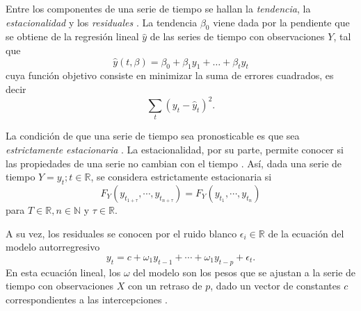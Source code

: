 \documentclass[final,5p,times,twocolumn]{elsarticle}
\begin{document}
Entre los componentes de una serie de tiempo se hallan la \textit{tendencia}, la \textit{estacionalidad} y los \textit{residuales} \cite{brockwell2016}. La tendencia $\beta_0$ viene dada por la pendiente que se obtiene de la regresión lineal $\hat{y}$ de las series de tiempo con observaciones $Y$, tal que
\begin{equation}
  \hat{y}(t, \beta) = \beta_0 + \beta_1 y_1 + \ldots + \beta_t y_t
\end{equation}
cuya función objetivo consiste en minimizar la suma de errores cuadrados, es decir
\begin{equation}
  \sum_t (y_t - \hat{y}_t)^2.
\end{equation}

La condición de que una serie de tiempo sea pronosticable es que sea \textit{estrictamente estacionaria} \cite{brockwell2016}. La estacionalidad, por su parte, permite conocer si las propiedades de una serie no cambian con el tiempo \cite{coxEA1965}. Así, dada una serie de tiempo $Y = y_t; t \in \mathbb{R}$, se considera estrictamente estacionaria si
\begin{equation}
  F_Y(y_{t_{1 + \tau}}, \cdots, y_{t_{n + \tau}}) = F_Y(y_{t_{1}}, \cdots, y_{t_{n}})
\end{equation}
para $T \in \mathbb{R}, n \in \mathbb{N}$ y $\tau \in \mathbb{R}$.

A su vez, los residuales se conocen por el ruido blanco $\epsilon_i \in \mathbb{R}$ de la ecuación del modelo autorregresivo
\begin{equation}
  y_t = c + \omega_1 y_{t - 1} + \cdots + \omega_1 y_{t - p} + \epsilon_t.
\end{equation}
En esta ecuación lineal, los $\omega$ del modelo son los pesos que se ajustan a la serie de tiempo con observaciones $X$ con un retraso de $p$, dado un vector de constantes $c$ correspondientes a las intercepciones \cite{brockwell2016}.
\end{document}
